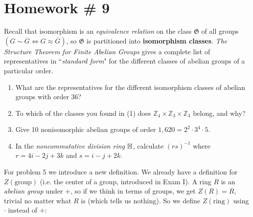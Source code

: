 \section{Homework \# 9}
\label{sec:HW9}

Recall that isomorphism is an \textit{equivalence relation} on the class $ \mathfrak{G} $ of all groups $( G \sim \overline{G} \iff G \approx \overline{G} )$,  
so $ \mathfrak{G} $ is partitioned into \textbf{isomorphism classes}.  
\textit{The Structure Theorem for Finite Abelian Groups} gives a complete list of representatives in ``\textit{standard form}"  
for the different classes of abelian groups of a particular order. \\ \steezybreak


\begin{enumerate}
    \item What are the representatives for the different isomorphism classes of abelian groups with order 36? \\ \steezybreak
    
    \item To which of the classes you found in (1) does $ \mathbb{Z}_4 \times \mathbb{Z}_3 \times \mathbb{Z}_3 $ belong, and why? \\ \steezybreak

    \item Give 10 nonisomorphic abelian groups of order $ 1,620 = 2^2 \cdot 3^4 \cdot 5 $. \\ \steezybreak

    \item In the \textit{noncommutative division ring} $ {\mathbb{H}} $, calculate $ (rs)^{-1} $  
    where $ r = 4i - 2j + 3k $ and $ s = i - j + 2k $. \\ \steezybreak
\end{enumerate}
\vspace{0.1in}
\begin{tcolorbox}
    For problem 5 we introduce a new definition. We already have a definition for $ Z(\text{group}) $ (i.e. the center of a group, introduced in Exam I).  
    A ring $ R $ is an \textit{abelian group} under $ + $, so if we think in terms of groups,  
    we get $ Z(R) = R $, trivial no matter what $ R $ is (which tells us nothing).  So we define $ Z(\text{ring}) $ using $ \cdot $ instead of $ + $:
\end{tcolorbox}

